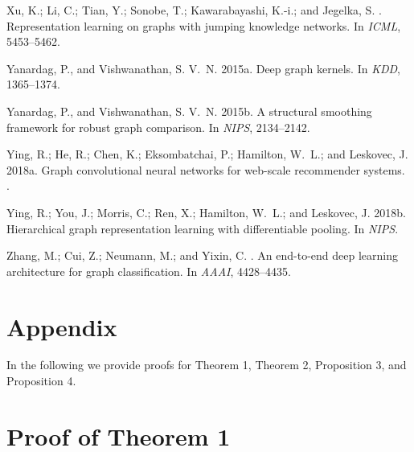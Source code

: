 \documentclass[letterpaper]{article}
\theoremstyle{definition}
\begin{document}
\begin{thebibliography}{}
	Xu, K.; Li, C.; Tian, Y.; Sonobe, T.; Kawarabayashi, K.-i.; and Jegelka, S.
	.
	\newblock Representation learning on graphs with jumping knowledge networks.
	\newblock In {\em ICML},  5453--5462.
	
	Yanardag, P., and Vishwanathan, S. V.~N.
	\newblock 2015a.
	\newblock Deep graph kernels.
	\newblock In {\em KDD},  1365--1374.
	
	Yanardag, P., and Vishwanathan, S. V.~N.
	\newblock 2015b.
	\newblock A structural smoothing framework for robust graph comparison.
	\newblock In {\em NIPS},  2134--2142.
	
	Ying, R.; He, R.; Chen, K.; Eksombatchai, P.; Hamilton, W.~L.; and Leskovec, J.
	\newblock 2018a.
	\newblock Graph convolutional neural networks for web-scale recommender
	systems.
	.
	
	Ying, R.; You, J.; Morris, C.; Ren, X.; Hamilton, W.~L.; and Leskovec, J.
	\newblock 2018b.
	\newblock Hierarchical graph representation learning with differentiable
	pooling.
	\newblock In {\em NIPS}.
	
	Zhang, M.; Cui, Z.; Neumann, M.; and Yixin, C.
	.
	\newblock An end-to-end deep learning architecture for graph classification.
	\newblock In {\em AAAI},  4428--4435.
	
\end{thebibliography}



\onecolumn

\fontsize{11.0pt}{14.0pt} \selectfont

\section{\LARGE Appendix}

In the following we provide proofs for Theorem 1, Theorem 2, Proposition 3, and Proposition 4.

\section{Proof of Theorem 1}
\end{document}
